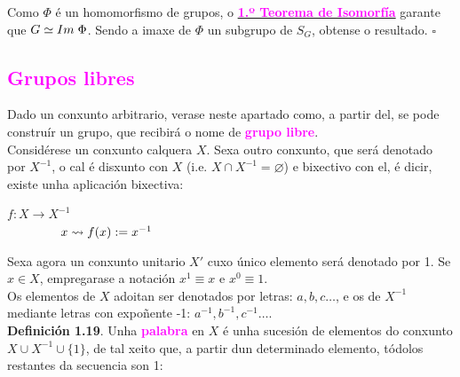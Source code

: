 \documentclass[twoside]{report}
\newcommand{\magbf}[1]{\textcolor{magenta}{\textbf{#1}}} %
\theoremstyle{mystyle}
\begin{document}
\noindent Como $\Phi$ é un homomorfismo de grupos, o \hyperref[th1.5]{\magbf{1.º Teorema de Isomorfía}} garante que $G \simeq Im \hspace{1mm} \Phi$. Sendo a imaxe de $\Phi$ un subgrupo de $S_{G}$, obtense o resultado. $\square$

\vspace{3mm}

\textcolor{magenta}{\section{Grupos libres}}

\vspace{5mm}

\noindent Dado un conxunto arbitrario, verase neste apartado como, a partir del, se pode construír un grupo, que recibirá o nome de \magbf{grupo libre}.\\

\noindent Considérese un conxunto calquera $X$. Sexa outro conxunto, que será denotado por $X^{-1}$, o cal é disxunto con $X$ (i.e. $X \cap X^{-1} = \varnothing$) e bixectivo con el, é dicir, existe unha aplicación bixectiva: \\

    \begin{center}
            $f: X \longrightarrow X^{-1}$ \\
        \vspace{2mm}
        $\hspace{15mm} x \leadsto f(x) := x^{-1}$
    \end{center} 
    
\noindent Sexa agora un conxunto unitario $X'$ cuxo único elemento será denotado por 1. Se $x \in X$, empregarase a notación $x^{1} \equiv x$ e $x^{0} \equiv 1$.\\

\noindent Os elementos de $X$ adoitan ser denotados por letras: $a,b,c \dots$, e os de $X^{-1}$ mediante letras con expoñente -1: $a^{-1}, b^{-1}, c^{-1} \dots$.\\

\noindent \textbf{Definición 1.19}. Unha \magbf{palabra} en $X$ é unha sucesión de elementos do conxunto $X \cup X^{-1} \cup \{1\}$, de tal xeito que, a partir dun determinado elemento, tódolos restantes da secuencia son 1:\\

\end{document}
